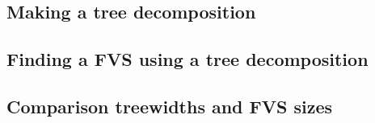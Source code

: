 \subsection{Making a tree decomposition} \label{sec:treewidth1}

\subsection{Finding a FVS using a tree decomposition} \label{sec:treewidth2}

\subsection{Comparison treewidths and FVS sizes} \label{sec:treewidth3}